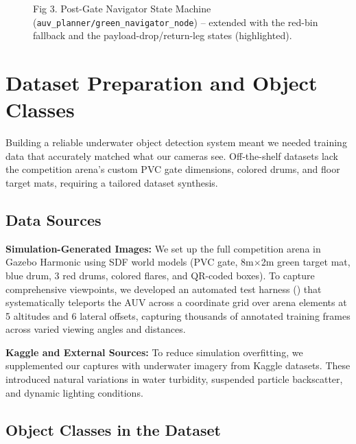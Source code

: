 \documentclass[10.5pt,a4paper]{article}
\newcommand{\hl}[1]{\tikz[baseline=(t.base)]{\node[fill=codeorange,rounded corners=2pt,inner sep=2pt,font=\ttfamily\scriptsize,text=codeorangetxt] (t) {#1};}}
\begin{document}
\begin{figure}[H]
\caption{Fig 3. Post-Gate Navigator State Machine (\texttt{auv\_planner/green\_navigator\_node}) -- extended with the red-bin fallback and the payload-drop/return-leg states (highlighted).}
\end{figure}

\section{Dataset Preparation and Object Classes}

Building a reliable underwater object detection system meant we needed training data that
accurately matched what our cameras see. Off-the-shelf datasets lack the competition arena's
custom PVC gate dimensions, colored drums, and floor target mats, requiring a tailored
dataset synthesis.

\subsection{Data Sources}

\textbf{Simulation-Generated Images:} We set up the full competition arena in Gazebo
Harmonic using SDF world models (PVC gate, 8m$\times$2m green target mat, blue drum, 3 red
drums, colored flares, and QR-coded boxes). To capture comprehensive viewpoints, we developed
an automated test harness (\hl{bottom\_cam\_altitude\_test.py}) that systematically teleports
the AUV across a coordinate grid over arena elements at 5 altitudes and 6 lateral offsets,
capturing thousands of annotated training frames across varied viewing angles and distances.

\textbf{Kaggle and External Sources:} To reduce simulation overfitting, we supplemented our
captures with underwater imagery from Kaggle datasets. These introduced natural variations in
water turbidity, suspended particle backscatter, and dynamic lighting conditions.

\subsection{Object Classes in the Dataset}
\end{document}
